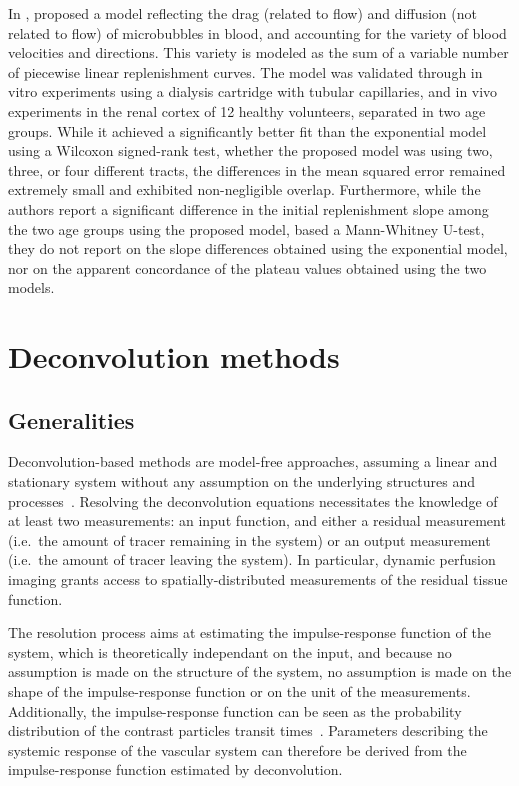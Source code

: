 In \citeyear{Quaia:2009fs}, \citet{Quaia:2009fs} proposed a model reflecting the drag (related to flow) and diffusion (not related to flow) of microbubbles in blood, and accounting for the variety of blood velocities and directions. %
This variety is modeled as the sum of a variable number of piecewise linear replenishment curves.
The model was validated through in vitro experiments using a dialysis cartridge with tubular capillaries, and in vivo experiments in the renal cortex of 12 healthy volunteers, separated in two age groups. 
While it achieved a significantly better fit than the exponential model using a Wilcoxon signed-rank test, whether the proposed model was using two, three, or four different tracts, the differences in the mean squared error remained extremely small and exhibited non-negligible overlap.
Furthermore, while the authors report a significant difference in the initial replenishment slope among the two age groups using the proposed model, based a Mann-Whitney U-test, they do not report on the slope differences obtained using the exponential model, nor on the apparent concordance of the plateau values obtained using the two models.

\section{Deconvolution methods}
\label{sec:DeconvolutionMethods}
\subsection{Generalities}
Deconvolution-based methods are model-free approaches, assuming a linear and stationary system without any assumption on the underlying structures and processes~\cite{Lassen:1979tk}.
Resolving the deconvolution equations necessitates the knowledge of at least two measurements: an input function, and either a residual measurement (i.e.~the amount of tracer remaining in the system) or an output measurement (i.e.~the amount of tracer leaving the system).
In particular, dynamic perfusion imaging grants access to spatially-distributed measurements of the residual tissue function.

The resolution process aims at estimating the impulse-response function of the system, which is theoretically independant on the input, and because no assumption is made on the structure of the system, no assumption is made on the shape of the impulse-response function or on the unit of the measurements.
Additionally, the impulse-response function can be seen as the probability distribution of the contrast particles transit times~\cite{Lassen:1979vj}.
Parameters describing the systemic response of the vascular system can therefore be derived from the impulse-response function estimated by deconvolution.

